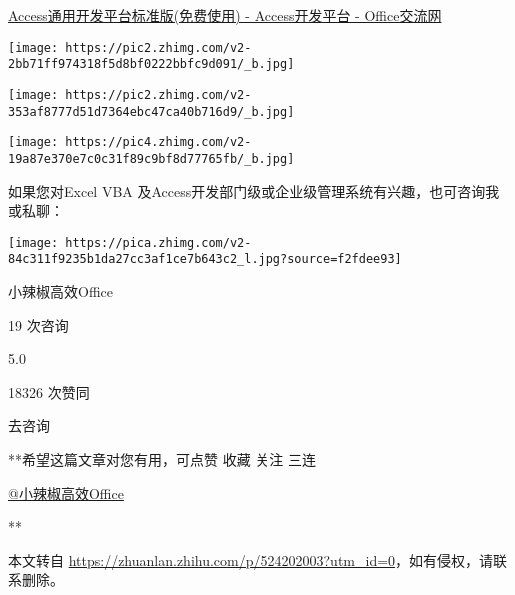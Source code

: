\documentclass[
]{article}
\begin{document}
\href{https://link.zhihu.com/?target=http\%3A//www.office-cn.net/product/2.html}{}

\href{https://link.zhihu.com/?target=http\%3A//www.office-cn.net/product/2.html}{Access通用开发平台标准版(免费使用)
- Access开发平台 - Office交流网}

\texttt{[image: https://pic2.zhimg.com/v2-2bb71ff974318f5d8bf0222bbfc9d091/\_b.jpg]}

\texttt{[image: https://pic2.zhimg.com/v2-353af8777d51d7364ebc47ca40b716d9/\_b.jpg]}

\texttt{[image: https://pic4.zhimg.com/v2-19a87e370e7c0c31f89c9bf8d77765fb/\_b.jpg]}

如果您对Excel VBA
及Access开发部门级或企业级管理系统有兴趣，也可咨询我或私聊：

\texttt{[image: https://pica.zhimg.com/v2-84c311f9235b1da27cc3af1ce7b643c2\_l.jpg?source=f2fdee93]}

小辣椒高效Office

19 次咨询

5.0

18326 次赞同

去咨询

**希望这篇文章对您有用，可点赞 收藏 关注 三连

\href{//www.zhihu.com/people/61181a729ad96882fd24553e3f54ac6f}{@小辣椒高效Office}

**

本文转自
\url{https://zhuanlan.zhihu.com/p/524202003?utm_id=0}，如有侵权，请联系删除。
\end{document}
